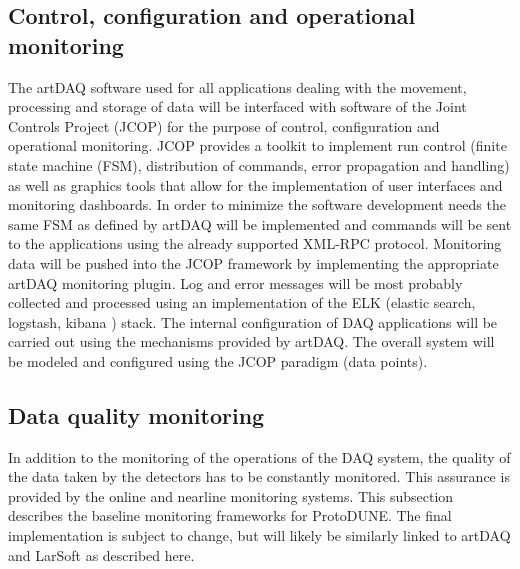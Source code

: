 \subsection{Control, configuration and operational monitoring}

The artDAQ software used for all applications dealing with the movement,
processing and storage of data will be interfaced with software of the
Joint Controls Project (JCOP) for the purpose of control, configuration
and operational monitoring.  JCOP provides a toolkit to implement run
control (finite state machine (FSM), distribution of commands, error
propagation and handling) as well as graphics tools that allow for the
implementation of user interfaces and monitoring dashboards.  In order to
minimize the software development needs the same FSM as defined by artDAQ
will be implemented and commands will be sent to the applications using
the already supported XML-RPC protocol.  Monitoring data will be pushed
into the JCOP framework by implementing the appropriate artDAQ monitoring
plugin.  Log and error messages will be most probably collected and
processed using an implementation of the ELK (elastic search, logstash,
kibana \cite{elastic:kibana}) stack. 
 The internal configuration of DAQ applications will be
carried out using the mechanisms provided by artDAQ. The overall system
will be modeled and configured using the JCOP paradigm (data points).



\subsection{Data quality monitoring}

In addition to the monitoring of the operations of the DAQ system, the
quality of the data taken by the detectors has to be constantly monitored.
This assurance is provided by the online and nearline monitoring systems.
This subsection describes the baseline monitoring frameworks for ProtoDUNE.  
The final implementation is subject to change, but will likely be similarly
linked to artDAQ and LarSoft as described here.

